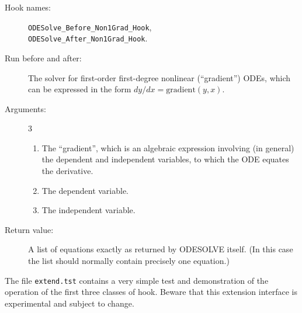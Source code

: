 \begin{description}
\item[Hook names:] \verb|ODESolve_Before_Non1Grad_Hook|, \\
\verb|ODESolve_After_Non1Grad_Hook|.
\item[Run before and after:] The solver for first-order first-degree
nonlinear (``gradient'') ODEs, which can be expressed in the form
$dy/dx = \mathrm{gradient}(y,x)$.
\item[Arguments:] 3
\begin{enumerate}
\item The ``gradient'', which is an algebraic expression involving (in
general) the dependent and independent variables, to which the ODE
equates the derivative.
\item The dependent variable.
\item The independent variable.
\end{enumerate}
\item[Return value:] A list of equations exactly as returned by
ODESOLVE itself.  (In this case the list should normally contain
precisely one equation.)
\end{description}

\noindent\hrulefill
\bigskip

The file \texttt{extend.tst} contains a very simple test and
demonstration of the operation of the first three classes of hook.
Beware that this extension interface is experimental and subject to
change.
